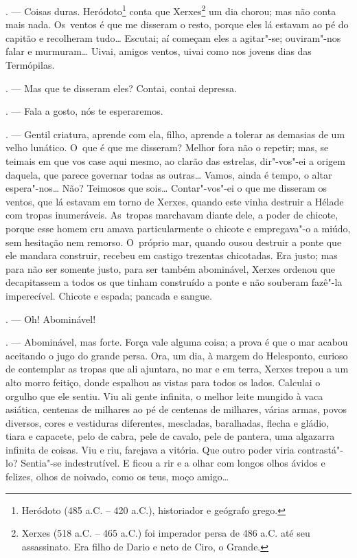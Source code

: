 \begin{linenumbers}
\begin{Parskip}
. --- Coisas duras. Heródoto\footnote{Heródoto (485 a.C. --
  420 a.C.), historiador e geógrafo grego.} conta que Xerxes\footnote{Xerxes
   (518 a.C. -- 465 a.C.) foi imperador persa de 486 a.C. até seu
  assassinato. Era filho de Dario  e neto de Ciro, o Grande.} um dia
chorou; mas não conta mais nada. Os~ventos é que me disseram o resto,
porque eles lá estavam ao pé do capitão e recolheram tudo\ldots{} Escutai; aí
começam eles a agitar"-se; ouviram"-nos falar e murmuram\ldots{} Uivai, amigos
ventos, uivai como nos jovens dias das Termópilas.

. --- Mas que te disseram eles? Contai, contai depressa.

. --- Fala a gosto, nós te esperaremos.

. --- Gentil criatura, aprende com ela, filho, aprende a
tolerar as demasias de um velho lunático. O~que é que me disseram?
Melhor fora não o repetir; mas, se teimais em que vos case aqui mesmo,
ao clarão das estrelas, dir"-vos"-ei a origem daquela, que parece governar
todas as outras\ldots{} Vamos, ainda é tempo, o altar espera"-nos\ldots{} Não?
Teimosos que sois\ldots{} Contar"-vos"-ei o que me disseram os ventos, que lá
estavam em torno de Xerxes, quando este vinha destruir a Hélade com
tropas inumeráveis. As~tropas marchavam diante dele, a poder de chicote,
porque esse homem cru amava particularmente o chicote e empregava"-o a
miúdo, sem hesitação nem remorso. O~próprio mar, quando ousou destruir a
ponte que ele mandara construir, recebeu em castigo trezentas
chicotadas. Era justo; mas para não ser somente justo, para ser também
abominável, Xerxes ordenou que decapitassem a todos os que tinham
construído a ponte e não souberam fazê"-la imperecível. Chicote e espada;
pancada e sangue.

. --- Oh! Abominável!

. --- Abominável, mas forte. Força vale alguma coisa; a
prova é que o mar acabou aceitando o jugo do grande persa. Ora, um dia,
à margem do Helesponto, curioso de contemplar as tropas que ali
ajuntara, no mar e em terra, Xerxes trepou a um alto morro feitiço,
donde espalhou as vistas para todos os lados. Calculai o orgulho que ele
sentiu. Viu ali gente infinita, o melhor leite mungido à vaca asiática,
centenas de milhares ao pé de centenas de milhares, várias armas, povos
diversos, cores e vestiduras diferentes, mescladas, baralhadas, flecha e
gládio, tiara e capacete, pelo de cabra, pele de cavalo, pele de
pantera, uma algazarra infinita de coisas. Viu e riu, farejava a
vitória. Que outro poder viria contrastá"-lo? Sentia"-se indestrutível. E
ficou a rir e a olhar com longos olhos ávidos e felizes, olhos de
noivado, como os teus, moço amigo\ldots{}


\end{Parskip}
\end{linenumbers}
